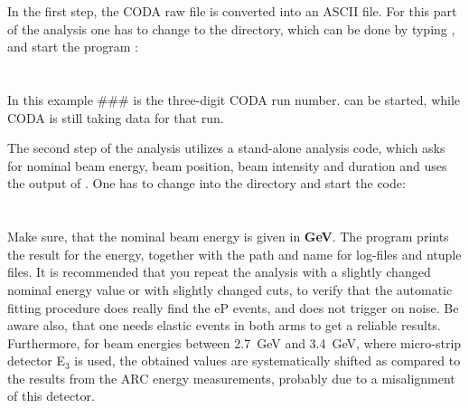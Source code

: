{{In the first step, the CODA raw file is converted into an
ASCII file.
For this part of the analysis one has to change to the 
directory, which can be done by typing , and start
the program :\\
\\
\\
In this example \#\#\# is the three-digit CODA run number.  can be started,
while CODA is still taking data for that run.

The second step of the analysis utilizes a stand-alone analysis code,
which asks for nominal beam energy, beam position, beam intensity
and duration and uses the output of . One has to
change into the  directory and start the code:\\
\\
\\
Make sure, that the nominal beam energy is given in \textbf{GeV}.
The program prints the result for the energy, together with
the path and name for log-files and ntuple files.
It is recommended that you repeat the analysis with a slightly changed
nominal energy value or with slightly changed cuts, to verify that
the automatic fitting procedure does really find the eP events,
and does not trigger on noise. Be aware also, that one
needs elastic events in both arms to get a reliable results.
Furthermore, for beam energies between 2.7~GeV and 3.4~GeV,
where micro-strip detector E$_3$ is used, the obtained
values are systematically shifted as compared to the results from the ARC energy measurements, 
probably due to a misalignment of this detector.
}}

